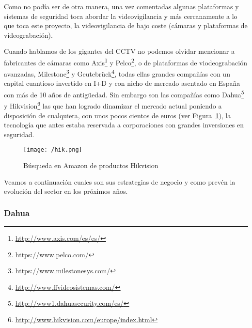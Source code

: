 Como no podía ser de otra manera, una vez comentadas algunas plataformas y sistemas de seguridad toca abordar la videovigilancia y más cercanamente a lo que toca este proyecto, la videovigilancia de bajo coste (cámaras y plataformas de videograbación).

Cuando hablamos de los gigantes del \acs{CCTV} no podemos olvidar mencionar a fabricantes de cámaras como Axis\footnote{\url{http://www.axis.com/es/es/}} y Pelco\footnote{\url{https://www.pelco.com/}}, o de plataformas de viodeograbación avanzadas, Milestone\footnote{\url{https://www.milestonesys.com/}} y Geutebrück\footnote{\url{http://www.ffvideosistemas.com/}}, todas ellas grandes compañías con un capital cuantioso invertido en \acs{I+D} y con nicho de mercado asentado en España con más de 10 años de antigüedad. Sin embargo son las compañías como Dahua\footnote{\url{http://www1.dahuasecurity.com/es/}} y Hikvision\footnote{\url{http://www.hikvision.com/europe/index.html}} las que han logrado dinamizar el mercado actual poniendo a disposición de cualquiera, con unos pocos cientos de euros (ver Figura~\ref{fig:hik}), la tecnología que antes estaba reservada a corporaciones con grandes inversiones en seguridad.

\begin{figure}[!h]
\centering
\texttt{[image: /hik.png]}
\caption{Búsqueda en Amazon de productos Hikvision~\cite{Hik_Amz}}
\label{fig:hik}
\end{figure}

Veamos a continuación cuales son sus estrategias de negocio y como prevén la evolución del sector en los próximos años.

\pagebreak

\subsubsection{Dahua}

